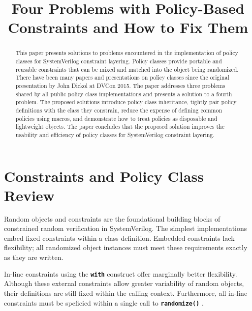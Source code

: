 \documentclass[conference,onecolumn]{IEEEtran}
\newcommand{\code}[1]{
\textbf{\texttt{#1}}
}
\begin{document}
\title{Four Problems with Policy-Based Constraints and How to Fix Them}

\author{
    \and
}

\maketitle

\thispagestyle{plain}
\pagestyle{plain}

\begin{abstract}
    This paper presents solutions to problems encountered in the implementation of policy classes for SystemVerilog constraint layering. Policy classes provide portable and reusable constraints that can be mixed and matched into the object being randomized. There have been many papers and presentations on policy classes since the original presentation by John Dickol at DVCon 2015. The paper addresses three problems shared by all public policy class implementations and presents a solution to a fourth problem. The proposed solutions introduce policy class inheritance, tightly pair policy definitions with the class they constrain, reduce the expense of defining common policies using macros, and demonstrate how to treat policies as disposable and lightweight objects. The paper concludes that the proposed solution improves the usability and efficiency of policy classes for SystemVerilog constraint layering.
\end{abstract}

\section{Constraints and Policy Class Review}

Random objects and constraints are the foundational building blocks of constrained random verification in SystemVerilog. The simplest implementations embed fixed constraints within a class definition.  Embedded constraints lack flexibility; all randomized object instances must meet these requirements exactly as they are written.

In-line constraints using the \code{with} construct offer marginally better flexibility.  Although these external constraints allow greater variability of random objects, their definitions are still fixed within the calling context.  Furthermore, all in-line constraints must be speficied within a single call to \code{randomize()}.
\end{document}
